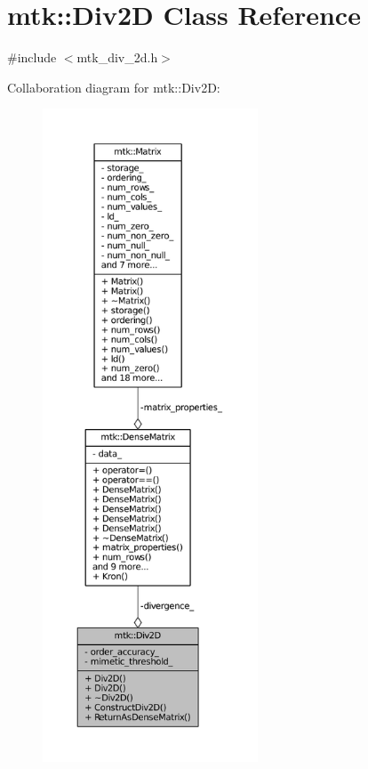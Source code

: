 \hypertarget{classmtk_1_1Div2D}{\section{mtk\+:\+:Div2\+D Class Reference}
\label{classmtk_1_1Div2D}
}


{\ttfamily \#include $<$mtk\+\_\+div\+\_\+2d.\+h$>$}



Collaboration diagram for mtk\+:\+:Div2\+D\+:\nopagebreak
\begin{figure}[H]
\begin{center}
\leavevmode
\includegraphics[height=550pt]{classmtk_1_1Div2D__coll__graph}
\end{center}
\end{figure}
